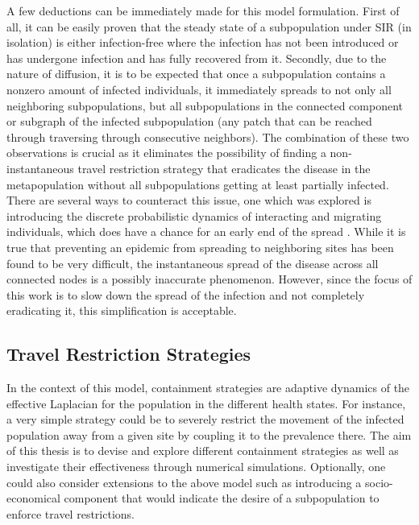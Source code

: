 A few deductions can be immediately made for this model formulation. First of all, it can be easily proven that the steady state of a subpopulation under SIR (in isolation) is either infection-free where the infection has not been introduced or has undergone infection and has fully recovered from it. Secondly, due to the nature of diffusion, it is to be expected that once a subpopulation contains a nonzero amount of infected individuals, it immediately spreads to not only all neighboring subpopulations, but all subpopulations in the connected component or subgraph of the infected subpopulation (any patch that can be reached through traversing through consecutive neighbors). The combination of these two observations is crucial as it eliminates the possibility of finding a non-instantaneous travel restriction strategy that eradicates the disease in the metapopulation without all subpopulations getting at least partially infected. There are several ways to counteract this issue, one which was explored is introducing the discrete probabilistic dynamics of interacting and migrating individuals, which does have a chance for an early end of the spread \cite{colizza2008epidemic}. While it is true that preventing an epidemic from spreading to neighboring sites has been found to be very difficult, the instantaneous spread of the disease across all connected nodes is a possibly inaccurate phenomenon. However, since the focus of this work is to slow down the spread of the infection and not completely eradicating it, this simplification is acceptable. \\

\subsection{Travel Restriction Strategies}
In the context of this model, containment strategies are adaptive dynamics of the effective Laplacian for the population in the different health states. For instance, a very simple strategy could be to severely restrict the movement of the infected population away from a given site by coupling it to the prevalence there. The aim of this thesis is to devise and explore different containment strategies as well as investigate their effectiveness through numerical simulations. Optionally, one could also consider extensions to the above model such as introducing a socio-economical component that would indicate the desire of a subpopulation to enforce travel restrictions\cite{colizza2007reaction}.\\

